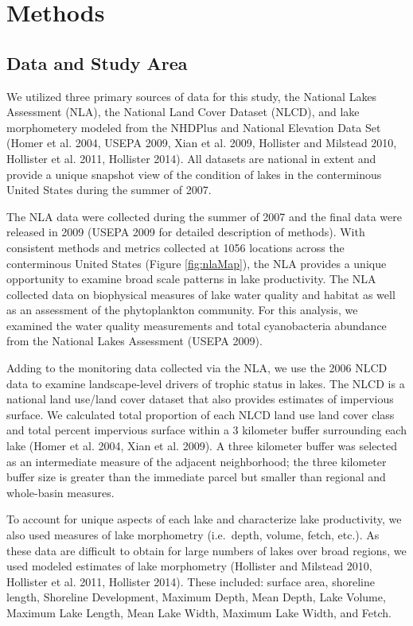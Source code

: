 \documentclass[11pt,]{article}
\begin{document}
\section{Methods}\label{methods}

\subsection{Data and Study Area}\label{data-and-study-area}

We utilized three primary sources of data for this study, the National
Lakes Assessment (NLA), the National Land Cover Dataset (NLCD), and lake
morphometery modeled from the NHDPlus and National Elevation Data Set
(Homer et al. 2004, USEPA 2009, Xian et al. 2009, Hollister and Milstead
2010, Hollister et al. 2011, Hollister 2014). All datasets are national
in extent and provide a unique snapshot view of the condition of lakes
in the conterminous United States during the summer of 2007.

The NLA data were collected during the summer of 2007 and the final data
were released in 2009 (USEPA 2009 for detailed description of methods).
With consistent methods and metrics collected at 1056 locations across
the conterminous United States (Figure \ref{fig:nlaMap}), the NLA
provides a unique opportunity to examine broad scale patterns in lake
productivity. The NLA collected data on biophysical measures of lake
water quality and habitat as well as an assessment of the phytoplankton
community. For this analysis, we examined the water quality measurements
and total cyanobacteria abundance from the National Lakes Assessment
(USEPA 2009).

Adding to the monitoring data collected via the NLA, we use the 2006
NLCD data to examine landscape-level drivers of trophic status in lakes.
The NLCD is a national land use/land cover dataset that also provides
estimates of impervious surface. We calculated total proportion of each
NLCD land use land cover class and total percent impervious surface
within a 3 kilometer buffer surrounding each lake (Homer et al. 2004,
Xian et al. 2009). A three kilometer buffer was selected as an
intermediate measure of the adjacent neighborhood; the three kilometer
buffer size is greater than the immediate parcel but smaller than
regional and whole-basin measures.

To account for unique aspects of each lake and characterize lake
productivity, we also used measures of lake morphometry (i.e.~depth,
volume, fetch, etc.). As these data are difficult to obtain for large
numbers of lakes over broad regions, we used modeled estimates of lake
morphometry (Hollister and Milstead 2010, Hollister et al. 2011,
Hollister 2014). These included: surface area, shoreline length,
Shoreline Development, Maximum Depth, Mean Depth, Lake Volume, Maximum
Lake Length, Mean Lake Width, Maximum Lake Width, and Fetch.
\end{document}
